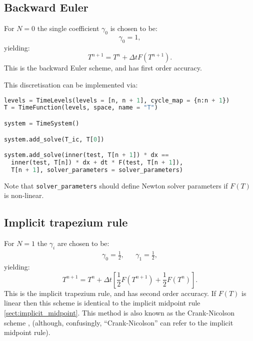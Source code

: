 \documentclass[a4paper]{book}
\begin{document}
\subsection{Backward Euler}\label{sect:be}

For $N = 0$ the single coefficient $\gamma_0$ is chosen to be:
\begin{equation}
  \gamma_0 = 1,
\end{equation}
yielding:
\begin{equation}
  T^{n + 1} = T^n + \Delta t F(T^{n + 1}).
\end{equation}
This is the backward Euler scheme, and has first order accuracy.

This discretisation can be implemented via:
\begin{lstlisting}[language = python, frame = single, basicstyle=\footnotesize]
levels = TimeLevels(levels = [n, n + 1], cycle_map = {n:n + 1})
T = TimeFunction(levels, space, name = "T")

system = TimeSystem()

system.add_solve(T_ic, T[0])

system.add_solve(inner(test, T[n + 1]) * dx ==
  inner(test, T[n]) * dx + dt * F(test, T[n + 1]),
  T[n + 1], solver_parameters = solver_parameters)
\end{lstlisting}
Note that \verb+solver_parameters+ should define Newton solver parameters if
$F(T)$ is non-linear.

\subsection{Implicit trapezium rule}\label{sect:implicit_trapezium}

For $N = 1$ the $\gamma_i$ are chosen to be:
\begin{align}
  \gamma_0 = \frac{1}{2}, & & \gamma_1 = \frac{1}{2},
\end{align}
yielding:
\begin{equation}
  T^{n + 1} = T^n + \Delta t \left[ \frac{1}{2} F(T^{n + 1}) + \frac{1}{2} F(T^n) \right].
\end{equation}
This is the implicit trapezium rule, and has second order accuracy. If $F(T)$ is
linear then this scheme is identical to the implicit midpoint rule
\ref{sect:implicit_midpoint}. This method is also known as the Crank-Nicolson
scheme \citep[e.g.][section 3.4]{donea2003}, (although, confusingly,
``Crank-Nicolson'' can refer to the implicit midpoint rule).
\end{document}
